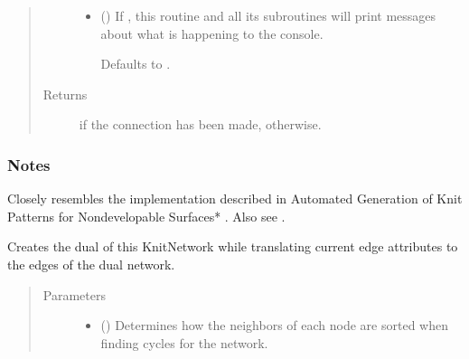 \documentclass[letterpaper,10pt,english]{sphinxmanual}
\begin{document}
\begin{fulllineitems}
\begin{fulllineitems}
\begin{quote}
\begin{description}
\begin{itemize}
\item {} 
 (\sphinxstyleliteralemphasis{\sphinxupquote{, }}) \textendash{} 
If , this routine and all its subroutines will print
messages about what is happening to the console.

Defaults to .


\end{itemize}

\item[{Returns}] \leavevmode
{} \textendash{}  if the connection has been made,
 otherwise.

\end{description}\end{quote}
\subsubsection*{Notes}

Closely resembles the implementation described in Automated Generation
of Knit Patterns for Non\sphinxhyphen{}developable Surfaces* \sphinxfootnotemark[1]. Also see  \sphinxfootnotemark[2].

\end{fulllineitems}


\begin{fulllineitems}
\label{\detokenize{cockatoo:cockatoo.KnitNetwork.create_dual}}
Creates the dual of this KnitNetwork while translating current edge
attributes to the edges of the dual network.
\begin{quote}\begin{description}
\item[{Parameters}] \leavevmode\begin{itemize}
\item {} 
 (\sphinxstyleliteralemphasis{\sphinxupquote{, }}) \textendash{} 
Determines how the neighbors of each node are sorted when finding
cycles for the network.


\end{itemize}
\end{description}
\end{quote}
\end{fulllineitems}
\end{fulllineitems}
\end{document}
